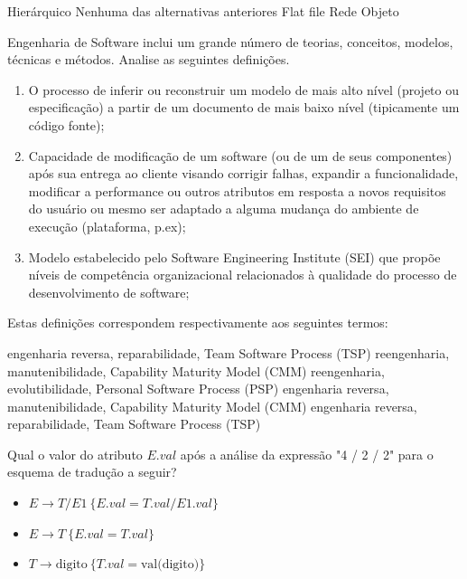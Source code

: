 \documentclass[12pt, addpoints]{exam}
\begin{document}
\begin{questions}
\begin{choices}
\choice Hierárquico
\choice Nenhuma das alternativas anteriores
\choice Flat file
\choice Rede
\choice Objeto
\end{choices}

\question
Engenharia de Software inclui um grande número de teorias, conceitos, modelos, técnicas e métodos. Analise as seguintes definições.
\begin{enumerate}[label=\Roman*.]
    \item O processo de inferir ou reconstruir um modelo de mais alto nível (projeto ou especificação) a partir de um documento de mais baixo nível (tipicamente um código fonte);
    \item Capacidade de modificação de um software (ou de um de seus componentes) após sua entrega ao cliente visando corrigir falhas, expandir a funcionalidade, modificar a performance ou outros atributos em resposta a novos requisitos do usuário ou mesmo ser adaptado a alguma mudança do ambiente de execução (plataforma, p.ex);
    \item Modelo estabelecido pelo Software Engineering Institute (SEI) que propõe níveis de competência organizacional relacionados à qualidade do processo de desenvolvimento de software;
\end{enumerate}
Estas definições correspondem respectivamente aos seguintes termos:
\begin{choices}
\choice engenharia reversa, reparabilidade, Team Software Process (TSP)
\choice reengenharia, manutenibilidade, Capability Maturity Model (CMM)
\choice reengenharia, evolutibilidade, Personal Software Process (PSP)
\choice engenharia reversa, manutenibilidade, Capability Maturity Model (CMM)
\choice engenharia reversa, reparabilidade, Team Software Process (TSP)
\end{choices}

\question
Qual o valor do atributo \( E.val \) após a análise da expressão "4 / 2 / 2" para o esquema de tradução a seguir?

\begin{itemize}
    \item \( E \rightarrow T / E1 \ \{ E.val = T.val / E1.val \} \)
    \item \( E \rightarrow T \ \{ E.val = T.val \} \)
    \item \( T \rightarrow \text{digito} \ \{ T.val = \text{val(digito)} \} \)
\end{itemize}

\begin{choices}
\end{choices}


\end{questions}
\end{document}
